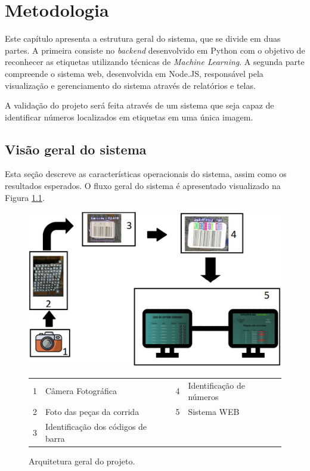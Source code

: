  \chapter{Metodologia}
 
Este capítulo apresenta a estrutura geral do sistema, que se divide em duas partes. A primeira consiste no \textit{backend} desenvolvido em Python com o objetivo de reconhecer as etiquetas utilizando técnicas de \textit{Machine Learning}. A segunda parte compreende o sistema web, desenvolvida em Node.JS, responsável pela visualização e gerenciamento do sistema através de relatórios e telas.

A validação do projeto será feita através de um sistema que seja capaz de identificar números localizados em etiquetas em uma única imagem.


\section{Visão geral do sistema} \label{sec:funcionamento}

Esta seção descreve as características operacionais do sistema, assim como os resultados esperados. O fluxo geral do sistema é apresentado visualizado na Figura \ref{fig:arqgeral}.

\begin{figure}[htbp]
	\centering
	\includegraphics[width=1\linewidth]{capitulos/FluxoDoProjeto.png}
	\caption{Arquitetura geral do projeto.}
	\begin{tabular}{r@{: }l r@{: }l}
    1 & Câmera Fotográfica & 4 & Identificação de números \\
    2& Foto das peças da corrida & 5 & Sistema WEB \\
    3 & Identificação dos códigos de  barra
    \end{tabular}
	\label{fig:arqgeral}
\end{figure}

